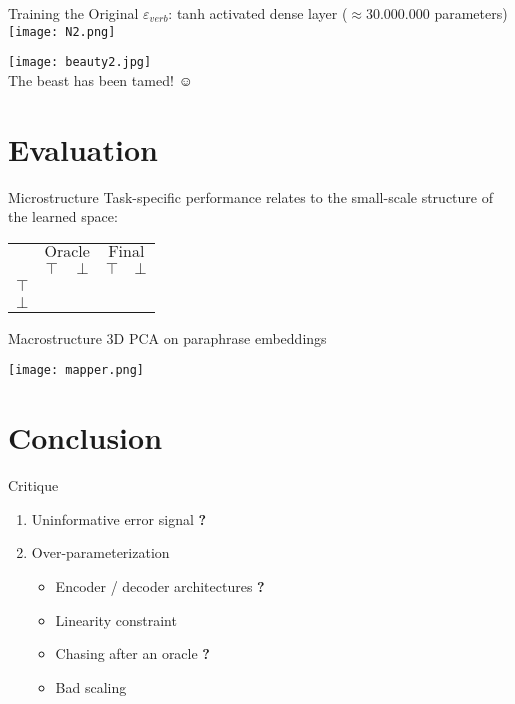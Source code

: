 \documentclass{beamer}
\newcommand{\xmark}{\ding{55}}
\begin{document}
\begin{frame}{Training the Original}
$\varepsilon_{verb}$: \alert{tanh activated dense layer} ($\approx 30.000.000$ parameters)
\texttt{[image: N2.png]}
\end{frame}

\begin{frame}[standout]
\texttt{[image: beauty2.jpg]}\\
The beast has been tamed! {\DejaSans ☺} 
\end{frame}

\section{Evaluation}

\begin{frame}{Microstructure}
Task-specific performance relates to the small-scale structure of the learned space:
\vspace{10pt}

\begin{tabular}{c|SS|SS} \toprule
    {} & 
     & 
    \\
    & $\top$ & $\bot$ & $\top$ & $\bot$\\
    \midrule
    $\top$  & \color{Yes}{0.92} & \color{No}{0.08} & \color{Yes}{0.88} & \color{No}{0.02} \\
    $\bot$  & \color{No}{0.08} & \color{Yes}{0.92} & \color{No}{0.12} & \color{Yes}{0.98} \\
   \bottomrule
\end{tabular}
\end{frame}

\begin{frame}{Macrostructure}
\alert{3D PCA on paraphrase embeddings}

\texttt{[image: mapper.png]}
\end{frame}

\section{Conclusion}

\begin{frame}{Critique}
\begin{enumerate}
\item Uninformative error signal \textcolor{Maybe}{\textbf{?}}
\item Over-parameterization
\begin{itemize}
\item[a)] Encoder / decoder architectures \textcolor{Maybe}{\textbf{?}}
\item[b)] Linearity constraint \textcolor{No}{\xmark}
\item[c)] Chasing after an oracle \textcolor{Maybe}{\textbf{?}}
\item[d)] Bad scaling \textcolor{No}{\xmark}
\end{itemize}
\end{enumerate}
\end{frame}
\end{document}
